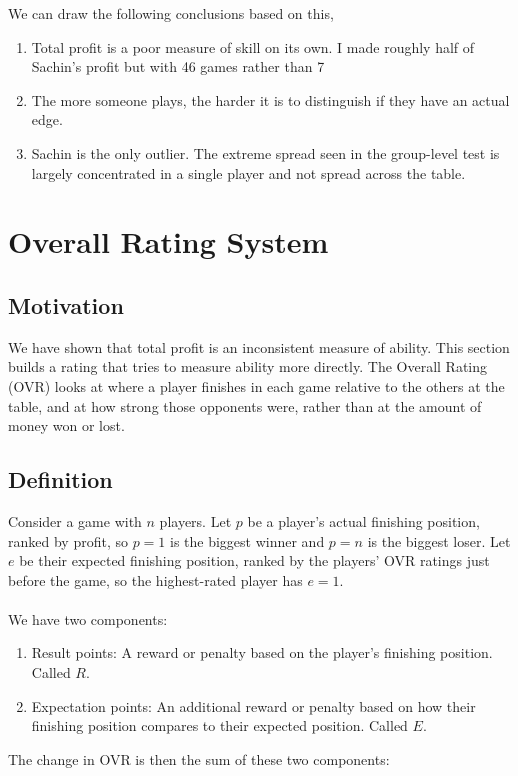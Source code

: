 \documentclass[11pt,a4paper]{article}
\begin{document}
We can draw the following conclusions based on this, \begin{enumerate}
  \item Total profit is a poor measure of skill on its own. I made roughly half of Sachin's profit but with 46 games rather than 7
  \item The more someone plays, the harder it is to distinguish if they have an actual edge.
  \item Sachin is the only outlier. The extreme spread seen in the group-level test is largely concentrated in a single player and not spread across the table.
\end{enumerate}

\section{Overall Rating System}

\subsection{Motivation}

We have shown that total profit is an inconsistent measure of ability. This section builds a rating that tries to
measure ability more directly. The Overall Rating (OVR) looks at where a player finishes in each game relative to the others at the table, and at how strong those opponents were, rather than at the amount of money won or lost.

\subsection{Definition}

Consider a game with $n$ players. Let $p$ be a player's actual finishing position, ranked by profit, so $p=1$ is the biggest winner and $p=n$ is the biggest loser. Let $e$ be their expected finishing position, ranked by the players' OVR ratings just before the game, so the highest-rated player has
$e=1$.\\\\
We have two components: 

\begin{enumerate}
    \item Result points: A reward or penalty based on the player's finishing position. Called $R$.
    \item Expectation points: An additional reward or penalty based on how their finishing position compares to their expected position. Called $E$.
\end{enumerate}
The change in OVR is then the sum of these two components:
\end{document}
